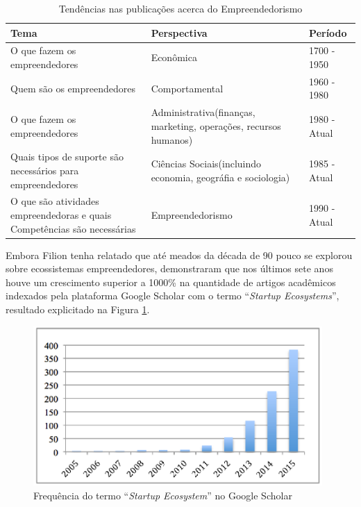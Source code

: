 \begin{table}[!htb]
	\centering
	\begin{tabular}{ | p{6cm} | p{6cm} | p{3cm} | }
		\hline
		\textbf{Tema} & \textbf{Perspectiva} & \textbf{Período} \\ \hline
		O que fazem os empreendedores & Econômica & 1700 - 1950 \\ \hline
		Quem são os empreendedores & Comportamental & 1960 - 1980 \\ \hline
		O que fazem os empreendedores & Administrativa(finanças, marketing, operações, recursos humanos) & 1980 - Atual \\ \hline
		Quais tipos de suporte são necessários para empreendedores & Ciências Sociais(incluindo economia, geográfia e sociologia) & 1985 - Atual \\ \hline
		O que são atividades empreendedoras e quais Competências são necessárias & Empreendedorismo & 1990 - Atual \\ \hline
	\end{tabular}
	\caption{Tendências nas publicações acerca do Empreendedorismo}
	\label{table:tendencias_nas_publicacoes_acerca_do_empreendedorismo}
\end{table}

Embora Filion tenha relatado que até meados da década de 90 pouco se explorou sobre ecossistemas empreendedores,   demonstraram que nos últimos sete anos houve um crescimento superior a 1000\% na quantidade de artigos acadêmicos indexados pela plataforma Google Scholar com o termo ``\textit{Startup Ecosystems}'', resultado explicitado na Figura \ref{figure:papers_about_startup_ecosystems}.

\begin{figure}[!htb]
	\centering
	\includegraphics[width=11cm,angle=0]{figuras/papers_about_startup_ecosystems}
	\caption{Frequência do termo ``\textit{Startup Ecosystem}'' no Google Scholar}
	\label{figure:papers_about_startup_ecosystems}
\end{figure}

